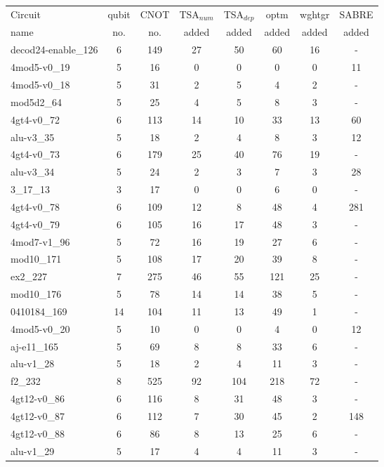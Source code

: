 \documentclass[journal]{IEEEtran}
\begin{document}
	\begin{table*}[htbp]
		\begin{center}  
			\begin{tabular}{|p{4.3cm}<{\centering}|c|c|c|c|c|c|c|}
				\hline
				Circuit &  qubit  & CNOT &TSA$_{num}$& TSA$_{dep}$  & optm 	 & wghtgr  &SABRE 	\\
				name	&   no. 	&	no. & added&  added &  added 	&  added&  added\\
				\hline
				decod24-enable\_126 & 6 & 149 & 27 & 50 & 60 & 16 & - \\ 
				4mod5-v0\_19 & 5 & 16 & 0 & 0 & 0 & 0 & 11 \\ 
				4mod5-v0\_18 & 5 & 31 & 2 & 5 & 4 & 2 & - \\ 
				mod5d2\_64 & 5 & 25 & 4 & 5 & 8 & 3 & - \\ 
				4gt4-v0\_72 & 6 & 113 & 14 & 10 & 33 & 13 & 60 \\ 
				alu-v3\_35 & 5 & 18 & 2 & 4 & 8 & 3 & 12 \\ 
				4gt4-v0\_73 & 6 & 179 & 25 & 40 & 76 & 19 & - \\ 
				alu-v3\_34 & 5 & 24 & 2 & 3 & 7 & 3 & 28 \\ 
				3\_17\_13 & 3 & 17 & 0 & 0 & 6 & 0 & - \\ 
				4gt4-v0\_78 & 6 & 109 & 12 & 8 & 48 & 4 & 281 \\ 
				4gt4-v0\_79 & 6 & 105 & 16 & 17 & 48 & 3 & - \\ 
				4mod7-v1\_96 & 5 & 72 & 16 & 19 & 27 & 6 & - \\ 
				mod10\_171 & 5 & 108 & 17 & 20 & 39 & 8 & - \\ 
				ex2\_227 & 7 & 275 & 46 & 55 & 121 & 25 & - \\ 
				mod10\_176 & 5 & 78 & 14 & 14 & 38 & 5 & - \\ 
				0410184\_169 & 14 & 104 & 11 & 13 & 49 & 1 & - \\ 
				4mod5-v0\_20 & 5 & 10 & 0 & 0 & 4 & 0 & 12 \\ 
				aj-e11\_165 & 5 & 69 & 8 & 8 & 33 & 6 & - \\ 
				alu-v1\_28 & 5 & 18 & 2 & 4 & 11 & 3 & - \\ 
				f2\_232 & 8 & 525 & 92 & 104 & 218 & 72 & - \\ 
				4gt12-v0\_86 & 6 & 116 & 8 & 31 & 48 & 3 & - \\ 
				4gt12-v0\_87 & 6 & 112 & 7 & 30 & 45 & 2 & 148 \\ 
				4gt12-v0\_88 & 6 & 86 & 8 & 13 & 25 & 6 & - \\ 
				alu-v1\_29 & 5 & 17 & 4 & 4 & 11 & 3 & - \\ 

\end{tabular}
\end{center}
\end{table*}
\end{document}
